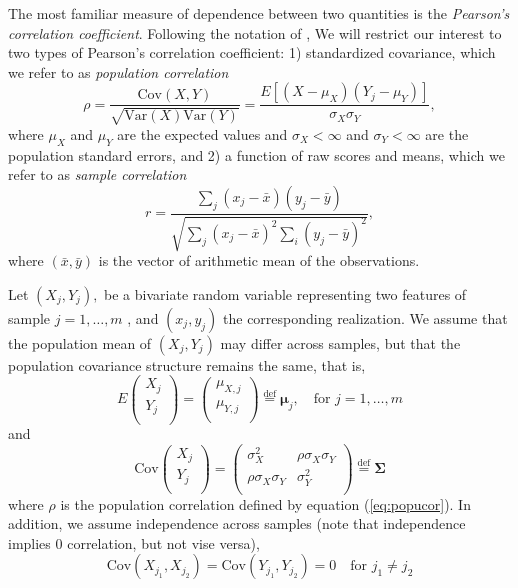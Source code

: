 \documentclass[12pt, a4paper]{article}
\newcommand{\cov}{\text{Cov}}
\newcommand{\var}{\text{Var}}
\newcommand{\samplecor}{sample correlation}
\newcommand{\popucor}{population correlation}
\begin{document}
	The most familiar measure of dependence between two quantities is 
	the \textit{Pearson's correlation coefficient}.  Following the notation of \citet{lee1988thirteen}, We will restrict our interest to two 
	types of Pearson's correlation coefficient: 1) standardized covariance, which we refer to as \textit{\popucor}
	\begin{equation}\label{eq:popucor}
	\rho =\dfrac{\cov(X, Y)}{\sqrt{\var(X)\var(Y)}} = \dfrac{E[(X-\mu_X)(Y_j-\mu_Y)]}{\sigma_X\sigma_Y}, 
	\end{equation} 	where $\mu_X$ and $\mu_Y$ are the expected values and $\sigma_X<\infty$ and $\sigma_Y<\infty$ are the population standard errors, and 2) a function of raw scores and means, which we refer to as \textit{\samplecor}
	\begin{equation}\label{eq:samplecor}
	r  =  \dfrac{\sum_j (x_j -\bar{x})(y_j - \bar{y})}{\sqrt{\sum_{j}(x_j - \bar{x})^2\sum_i(y_j - \bar{y})^2}}, 
	\end{equation}
	where $(\bar{x}, \bar{y})$ is the vector of arithmetic mean of the observations.
	
	
	Let $(X_j, Y_j),$ be a bivariate random variable representing two features of sample $j = 1, \ldots, m$ , and $(x_j, y_j)$ the corresponding realization.
	We assume that the population mean of $(X_j, Y_j)$ may differ across samples, but that the population covariance structure remains the 
	same, that is,  
	\begin{equation}\label{eq:meanstruct}
	E  \left(\begin{array}{c}
	X_j\\
	Y_j\\	
	\end{array} \right) 
	= 	\left(\begin{array}{c}
	\mu_{X,j}\\
	\mu_{Y,j}\\
	\end{array} \right)\stackrel{\text{def}}{=} \bm \mu_j,  \text{~~ for $j = 1, \ldots, m$}
	\end{equation}
	and 
	\begin{equation}\label{eq:covstruct}
	\cov\left(\begin{array}{c}
	X_j\\
	Y_j\\	
	\end{array} \right)	
	= \left(
	\begin{array}{cc}
	\sigma_X^2 &\rho \sigma_X\sigma_Y \\
	\rho \sigma_X \sigma_Y & 	\sigma_Y^2 \\
	\end{array} 
	\right)
	\stackrel{\text{def}}{=} \bm \Sigma 
	\end{equation}
	where $\rho$ is the population correlation defined by equation (\ref{eq:popucor}). In addition, we assume independence across samples (note that independence implies 0 correlation, but not vise versa), 
	\begin{equation}\label{eq:indepsamples}
	\cov(X_{j_1}, X_{j_2}) = \cov(Y_{j_1}, Y_{j_2}) = 0 \text{~~~for $j_1\neq j_2$}
	\end{equation}
	
\end{document}
